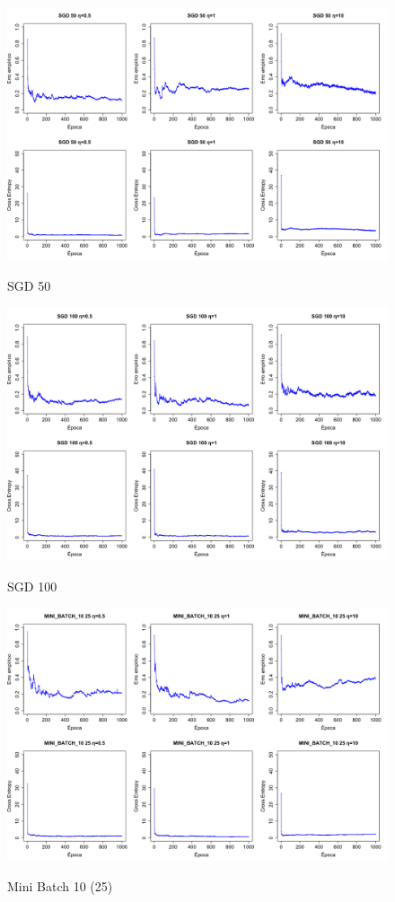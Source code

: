 \documentclass{report}
\begin{document}
\begin{figure}
  \includegraphics[width=\linewidth]{sgd_50.png}
  \label{fig:sgd_50}
  \caption{SGD 50}
\end{figure}

\begin{figure}
  \includegraphics[width=\linewidth]{sgd_100.png}
  \label{fig:sgd_100}
  \caption{SGD 100}
\end{figure}

\begin{figure}
  \includegraphics[width=\linewidth]{mini_batch_10_25.png}
  \label{fig:mini_batch_10_25}
  \caption{Mini Batch 10 (25)}
\end{figure}
\end{document}
